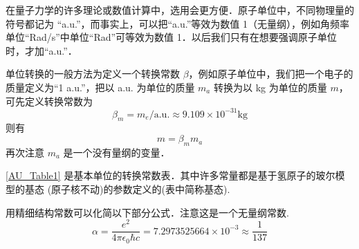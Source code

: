 
在量子力学的许多理论或数值计算中，选用会更方便．原子单位中，不同物理量的符号都记为 “a.u.”，而事实上，可以把“a.u.”等效为数值 1（无量纲），例如角频率单位“Rad/s”中单位“Rad”可等效为数值 1．以后我们只有在想要强调原子单位时，才加“a.u.”．

单位转换的一般方法为定义一个转换常数 $\beta$，例如原子单位中，我们把一个电子的质量定义为“1 a.u.”，把以 a.u. 为单位的质量 $m_a$ 转换为以 kg 为单位的质量 $m$，可先定义转换常数为
\begin{equation}
{\beta _m} = {m_e}/\text{a.u.} \approx 9.109 \times {10^{ - 31}}\text{kg}
\end{equation}
则有
\begin{equation}
m = {\beta _m}{m_a}
\end{equation}
再次注意 $m_a$ 是一个没有量纲的变量．

\autoref{AU_Table1} %
是基本单位的转换常数表．其中许多常量都是基于氢原子的玻尔模型的基态%
(原子核不动)的参数定义的(表中简称基态).

用精细结构常数可以化简以下部分公式．注意这是一个无量纲常数.
\begin{equation}
\alpha  = \frac{{{e^2}}}{{4\pi {\epsilon _0}\hbar c}} = 7.2973525664 \times {10^{ - 3}} \approx \frac{1}{{137}}
\end{equation}

